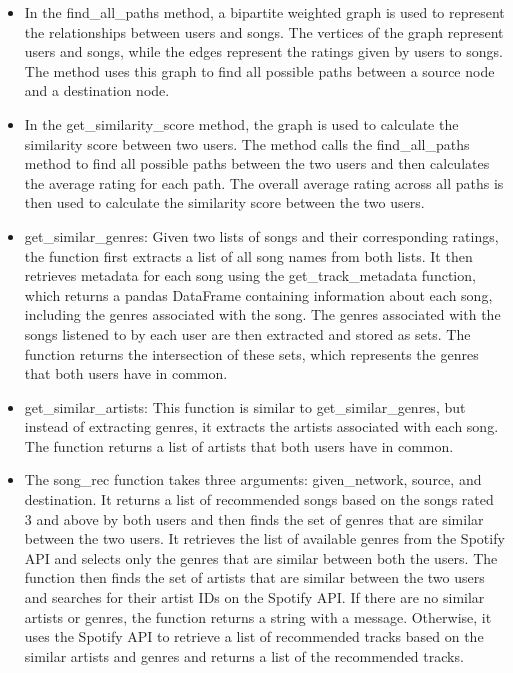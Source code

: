 \documentclass[fontsize=11pt]{article}
\begin{document}
\begin{itemize}
\item In the find\_all\_paths method, a bipartite weighted graph is used to represent the relationships between users and songs. The vertices of the graph represent users and songs, while the edges represent the ratings given by users to songs. The method uses this graph to find all possible paths between a source node and a destination node.
\item In the get\_similarity\_score method, the graph is used to calculate the similarity score between two users. The method calls the find\_all\_paths method to find all possible paths between the two users and then calculates the average rating for each path. The overall average rating across all paths is then used to calculate the similarity score between the two users.
\item get\_similar\_genres: Given two lists of songs and their corresponding ratings, the function first extracts a list of all song names from both lists. It then retrieves metadata for each song using the get\_track\_metadata function, which returns a pandas DataFrame containing information about each song, including the genres associated with the song. The genres associated with the songs listened to by each user are then extracted and stored as sets. The function returns the intersection of these sets, which represents the genres that both users have in common.
\item get\_similar\_artists: This function is similar to get\_similar\_genres, but instead of extracting genres, it extracts the artists associated with each song. The function returns a list of artists that both users have in common.
\item The song\_rec function takes three arguments: given\_network, source, and destination. It returns a list of recommended songs based on the songs rated 3 and above by both users and then finds the set of genres that are similar between the two users. It retrieves the list of available genres from the Spotify API and selects only the genres that are similar between both the users. The function then finds the set of artists that are similar between the two users and searches for their artist IDs on the Spotify API. If there are no similar artists or genres, the function returns a string with a message. Otherwise, it uses the Spotify API to retrieve a list of recommended tracks based on the similar artists and genres and returns a list of the recommended tracks.
\end{itemize}
\end{document}
